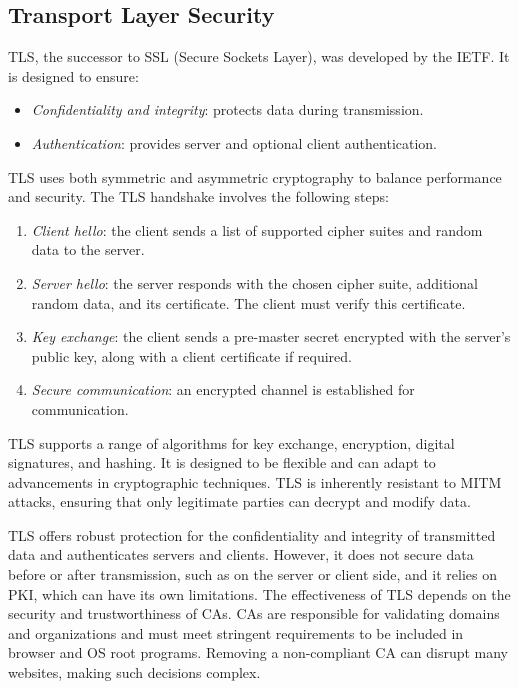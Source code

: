 \subsection{Transport Layer Security}
TLS, the successor to SSL (Secure Sockets Layer), was developed by the IETF. 
It is designed to ensure:
\begin{itemize}
    \item \textit{Confidentiality and integrity}: protects data during transmission.
    \item \textit{Authentication}: provides server and optional client authentication.
\end{itemize}
TLS uses both symmetric and asymmetric cryptography to balance performance and security. 
The TLS handshake involves the following steps:
\begin{enumerate}
    \item \textit{Client hello}: the client sends a list of supported cipher suites and random data to the server.
    \item \textit{Server hello}: the server responds with the chosen cipher suite, additional random data, and its certificate. 
        The client must verify this certificate.
    \item \textit{Key exchange}: the client sends a pre-master secret encrypted with the server's public key, along with a client certificate if required.
    \item \textit{Secure communication}: an encrypted channel is established for communication.
\end{enumerate}
TLS supports a range of algorithms for key exchange, encryption, digital signatures, and hashing. 
It is designed to be flexible and can adapt to advancements in cryptographic techniques. 
TLS is inherently resistant to MITM attacks, ensuring that only legitimate parties can decrypt and modify data.

TLS offers robust protection for the confidentiality and integrity of transmitted data and authenticates servers and clients.
However, it does not secure data before or after transmission, such as on the server or client side, and it relies on PKI, which can have its own limitations.
The effectiveness of TLS depends on the security and trustworthiness of CAs. 
CAs are responsible for validating domains and organizations and must meet stringent requirements to be included in browser and OS root programs. 
Removing a non-compliant CA can disrupt many websites, making such decisions complex.

